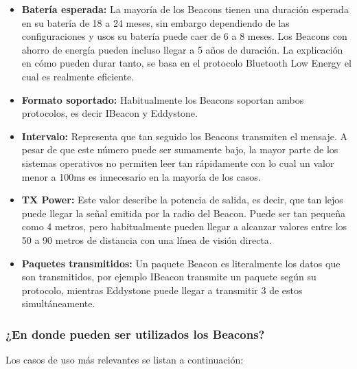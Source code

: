 \begin{itemize}
\item \textbf{Batería esperada: } La mayoría de los Beacons tienen una duración esperada en su batería de 18 a 24 meses, sin embargo dependiendo de las configuraciones y usos su batería puede caer de 6 a 8 meses. Los Beacons con ahorro de energía pueden incluso llegar a 5 años de duración. La explicación en cómo pueden durar tanto, se basa en el protocolo Bluetooth Low Energy el cual es realmente eficiente.

\item \textbf{Formato soportado: } Habitualmente los Beacons soportan ambos protocolos, es decir IBeacon y Eddystone.

\item \textbf{Intervalo: } Representa que tan seguido los Beacons transmiten el mensaje. A pesar de que este número puede ser sumamente bajo, la mayor parte de los sistemas operativos no permiten leer tan rápidamente con lo cual un valor menor a 100ms es innecesario en la mayoría de los casos.

\item \textbf{TX Power: } Este valor describe la potencia de salida, es decir, que tan lejos puede llegar la señal emitida por la radio del Beacon. Puede ser tan pequeña como 4 metros, pero habitualmente pueden llegar a alcanzar valores entre los 50 a 90 metros de distancia con una línea de visión directa.

\item \textbf{Paquetes transmitidos: } Un paquete Beacon es literalmente los datos que son transmitidos, por ejemplo IBeacon transmite un paquete según su protocolo, mientras Eddystone puede llegar a transmitir 3 de estos simultáneamente.

\end{itemize}

\subsubsection{¿En donde pueden ser utilizados los Beacons?}

Los casos de uso más relevantes se listan a continuación:

